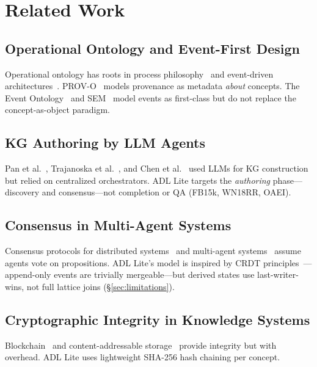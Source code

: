 \documentclass[11pt,a4paper]{article}
\theoremstyle{remark}
\begin{document}
\section{Related Work}
\label{sec:related}

\subsection{Operational Ontology and Event-First Design}

Operational ontology has roots in process philosophy~\cite{whitehead1929process} and event-driven architectures~\cite{fowler2005event}. PROV-O~\cite{lebo2013prov} models provenance as metadata \textit{about} concepts. The Event Ontology~\cite{raimond2007event} and SEM~\cite{vanhage2011sem} model events as first-class but do not replace the concept-as-object paradigm.

\subsection{KG Authoring by LLM Agents}

Pan et al.~\cite{pan2024unifying}, Trajanoska et al.~\cite{trajanoska2023enhancing}, and Chen et al.~\cite{chen2024exploring} used LLMs for KG construction but relied on centralized orchestrators. ADL Lite targets the \textit{authoring} phase---discovery and consensus---not completion or QA (FB15k, WN18RR, OAEI).

\subsection{Consensus in Multi-Agent Systems}

Consensus protocols for distributed systems~\cite{lamport1982byzantine,ongaro2014raft} and multi-agent systems~\cite{wooldridge2009multiagent,jurca2003reputation,brandt2016handbook} assume agents vote on propositions. ADL Lite's model is inspired by CRDT principles~\cite{shapiro2011crdt}---append-only events are trivially mergeable---but derived states use last-writer-wins, not full lattice joins (\S\ref{sec:limitations}).

\subsection{Cryptographic Integrity in Knowledge Systems}

Blockchain~\cite{third2017linkchains} and content-addressable storage~\cite{benet2014ipfs} provide integrity but with overhead. ADL Lite uses lightweight SHA-256 hash chaining per concept.
\end{document}
